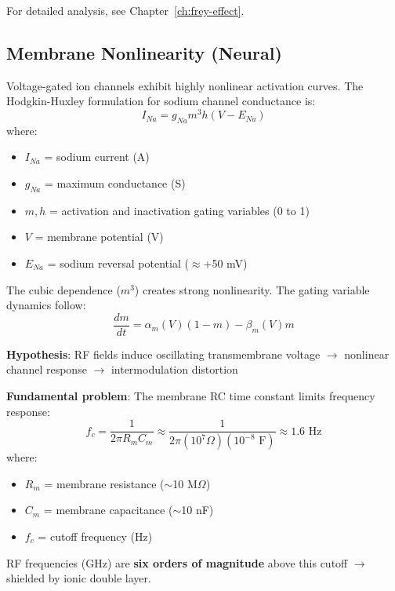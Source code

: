 For detailed analysis, see Chapter~\ref{ch:frey-effect}.

\subsection{Membrane Nonlinearity (Neural)}

Voltage-gated ion channels exhibit highly nonlinear activation curves. The Hodgkin-Huxley formulation for sodium channel conductance is:
\begin{equation}
\label{eq:hh-conductance}
I_{Na} = g_{Na} m^3 h (V - E_{Na})
\end{equation}
where:
\begin{itemize}
\item $I_{Na}$ = sodium current (A)
\item $g_{Na}$ = maximum conductance (S)
\item $m, h$ = activation and inactivation gating variables (0 to 1)
\item $V$ = membrane potential (V)
\item $E_{Na}$ = sodium reversal potential ($\approx$+50 mV)
\end{itemize}

The cubic dependence ($m^3$) creates strong nonlinearity. The gating variable dynamics follow:
\begin{equation}
\label{eq:gating-dynamics}
\frac{dm}{dt} = \alpha_m(V)(1-m) - \beta_m(V)m
\end{equation}

\textbf{Hypothesis}: RF fields induce oscillating transmembrane voltage $\rightarrow$ nonlinear channel response $\rightarrow$ intermodulation distortion

\textbf{Fundamental problem}: The membrane RC time constant limits frequency response:
\begin{equation}
\label{eq:rc-cutoff}
f_c = \frac{1}{2\pi R_m C_m} \approx \frac{1}{2\pi (10^7 \Omega)(10^{-8} \text{ F})} \approx 1.6 \text{ Hz}
\end{equation}
where:
\begin{itemize}
\item $R_m$ = membrane resistance ($\sim$10 M$\Omega$)
\item $C_m$ = membrane capacitance ($\sim$10 nF)
\item $f_c$ = cutoff frequency (Hz)
\end{itemize}

RF frequencies (GHz) are \textbf{six orders of magnitude} above this cutoff $\rightarrow$ shielded by ionic double layer.

